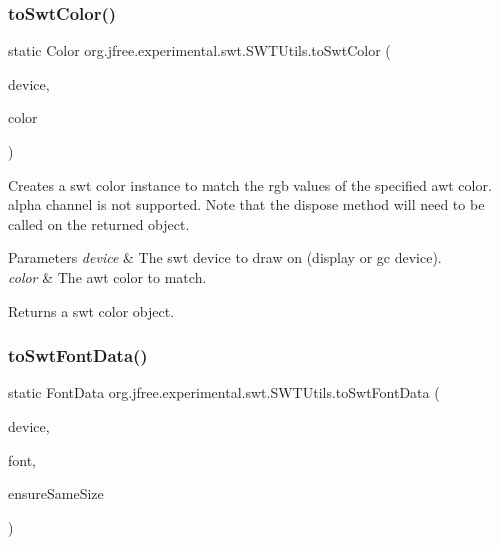 \subsubsection{\texorpdfstring{to\+Swt\+Color()}{toSwtColor()}\hspace{0.1cm}{\footnotesize\ttfamily [2/2]}}
{\footnotesize\ttfamily static Color org.\+jfree.\+experimental.\+swt.\+S\+W\+T\+Utils.\+to\+Swt\+Color (\begin{DoxyParamCaption}\item[{Device}]{device,  }\item[{java.\+awt.\+Color}]{color }\end{DoxyParamCaption})\hspace{0.3cm}{\ttfamily [static]}}

Creates a swt color instance to match the rgb values of the specified awt color. alpha channel is not supported. Note that the dispose method will need to be called on the returned object.


\begin{DoxyParams}{Parameters}
{\em device} & The swt device to draw on (display or gc device). \\
\hline
{\em color} & The awt color to match. \\
\hline
\end{DoxyParams}
\begin{DoxyReturn}{Returns}
a swt color object. 
\end{DoxyReturn}
\mbox{\label{classorg_1_1jfree_1_1experimental_1_1swt_1_1_s_w_t_utils_a706c8a8c41f1cdb1c6117b85d1aa12a4}} 
\subsubsection{\texorpdfstring{to\+Swt\+Font\+Data()}{toSwtFontData()}}
{\footnotesize\ttfamily static Font\+Data org.\+jfree.\+experimental.\+swt.\+S\+W\+T\+Utils.\+to\+Swt\+Font\+Data (\begin{DoxyParamCaption}\item[{Device}]{device,  }\item[{java.\+awt.\+Font}]{font,  }\item[{boolean}]{ensure\+Same\+Size }\end{DoxyParamCaption})\hspace{0.3cm}{\ttfamily [static]}}

